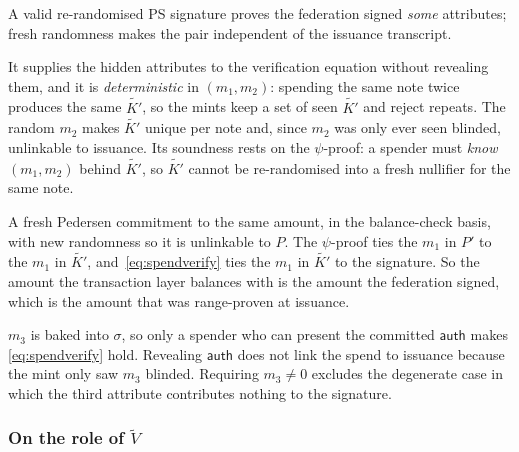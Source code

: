 \documentclass[10pt,a5paper]{article}
\newcommand{\K}[1]{#1}                      %
\newcommand{\Go}[1]{#1}                     %
\newcommand{\Gt}[1]{\tilde{#1}}             %
\newcommand{\K}[1]{{\color{ScalarCol}#1}}   %
\newcommand{\Go}[1]{{\color{GoneCol}#1}}    %
\newcommand{\Gt}[1]{{\color{GtwoCol}#1}}    %
\newcommand{\auth}{\mathsf{auth}}
\begin{document}
\begin{whybox}
\begin{description}[nosep,leftmargin=1.2em]
\item[$(\Go{B'},\Go{\sigma'})$ -- unforgeability, unlinkability.] A valid
  re-randomised PS signature proves the federation signed \emph{some}
  attributes; fresh randomness makes the pair independent of the issuance
  transcript.
\item[$\Gt{K'}$ -- the nullifier and the hidden message.] It supplies the
  hidden attributes to the verification equation without revealing them, and
  it is \emph{deterministic} in $(\K{m_1},\K{m_2})$: spending the same note
  twice produces the same $\Gt{K'}$, so the mints keep a set of seen $\Gt{K'}$
  and reject repeats. The random $\K{m_2}$ makes $\Gt{K'}$ unique per note and,
  since $\K{m_2}$ was only ever seen blinded, unlinkable to issuance. Its
  soundness rests on the $\psi$-proof: a spender must \emph{know}
  $(\K{m_1},\K{m_2})$ behind $\Gt{K'}$, so $\Gt{K'}$ cannot be re-randomised into
  a fresh nullifier for the same note.
\item[$\Go{P'}$ -- confidential amount at spend time.] A fresh Pedersen
  commitment to the same amount, in the balance-check basis, with new
  randomness so it is unlinkable to $\Go{P}$. The $\psi$-proof ties the
  $\K{m_1}$ in $\Go{P'}$ to the $\K{m_1}$ in $\Gt{K'}$, and~\eqref{eq:spendverify}
  ties the $\K{m_1}$ in $\Gt{K'}$ to the signature. So the amount the
  transaction layer balances with is the amount the federation signed, which is
  the amount that was range-proven at issuance.
\item[$\K{m_3}$, $\auth$ -- the spend condition.] $\K{m_3}$ is baked into
  $\Go{\sigma}$, so only a spender who can present the committed $\auth$ makes
  \eqref{eq:spendverify} hold. Revealing $\auth$ does not link the spend to
  issuance because the mint only saw $\K{m_3}$ blinded. Requiring
  $\K{m_3} \neq 0$ excludes the degenerate case in which the third attribute
  contributes nothing to the signature.
\end{description}
\end{whybox}

\subsubsection{On the role of \texorpdfstring{$\Gt{V}$}{V}}
\label{sec:V}
\end{document}
